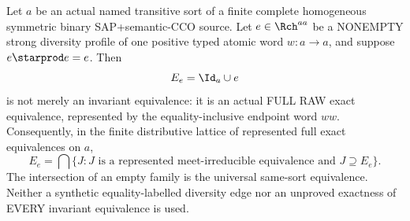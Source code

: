 \begin{lemma}
\label{lem:typed-idempotent-raw-exact}
Let \(a\) be an actual named transitive
sort of a finite complete homogeneous
symmetric binary SAP+semantic-CCO
source. Let \(e\in\Rch^{aa}\) be a
NONEMPTY strong diversity profile
of one positive typed atomic word
\(w:a\to a\), and suppose
\(e\starprod e=e\).
Then
\[
                 E_e=\Id_a\cup e
\]
is not merely an invariant
equivalence: it is an actual
FULL RAW exact equivalence,
represented by the equality-inclusive
endpoint word \(ww\).
Consequently, in the finite
distributive lattice of represented
full exact equivalences on \(a\),
\[
 E_e=\bigcap\{J:J\text{ is a represented
 meet-irreducible equivalence and }
                         J\supseteq E_e\}.
\tag{TF1}\label{eq:typed-idempotent-MI-meet}
\]
The intersection of an empty family
is the universal same-sort equivalence.
Neither a synthetic equality-labelled
diversity edge nor an unproved
exactness of EVERY invariant
equivalence is used.
\end{lemma}
